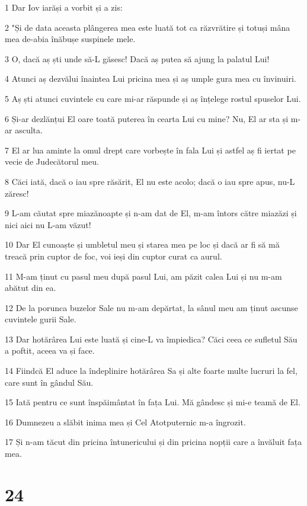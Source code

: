 \par 1 Dar Iov iarăși a vorbit și a zis:
\par 2 "Și de data aceasta plângerea mea este luată tot ca răzvrătire și totuși mâna mea de-abia înăbușe suspinele mele.
\par 3 O, dacă aș ști unde să-L găsesc! Dacă aș putea să ajung la palatul Lui!
\par 4 Atunci aș dezvălui înaintea Lui pricina mea și aș umple gura mea cu învinuiri.
\par 5 Aș ști atunci cuvintele cu care mi-ar răspunde și aș înțelege rostul spuselor Lui.
\par 6 Și-ar dezlănțui El oare toată puterea în cearta Lui cu mine? Nu, El ar sta și m-ar asculta.
\par 7 El ar lua aminte la omul drept care vorbește în fala Lui și astfel aș fi iertat pe vecie de Judecătorul meu.
\par 8 Căci iată, dacă o iau spre răsărit, El nu este acolo; dacă o iau spre apus, nu-L zăresc!
\par 9 L-am căutat spre miazănoapte și n-am dat de El, m-am întors către miazăzi și nici aici nu L-am văzut!
\par 10 Dar El cunoaște și umbletul meu și starea mea pe loc și dacă ar fi să mă treacă prin cuptor de foc, voi ieși din cuptor curat ca aurul.
\par 11 M-am ținut cu pasul meu după pasul Lui, am păzit calea Lui și nu m-am abătut din ea.
\par 12 De la porunca buzelor Sale nu m-am depărtat, la sânul meu am ținut ascunse cuvintele gurii Sale.
\par 13 Dar hotărârea Lui este luată și cine-L va împiedica? Căci ceea ce sufletul Său a poftit, aceea va și face.
\par 14 Fiindcă El aduce la îndeplinire hotărârea Sa și alte foarte multe lucruri la fel, care sunt în gândul Său.
\par 15 Iată pentru ce sunt înspăimântat în fața Lui. Mă gândesc și mi-e teamă de El.
\par 16 Dumnezeu a slăbit inima mea și Cel Atotputernic m-a îngrozit.
\par 17 Și n-am tăcut din pricina întunericului și din pricina nopții care a învăluit fața mea.

\chapter{24}

